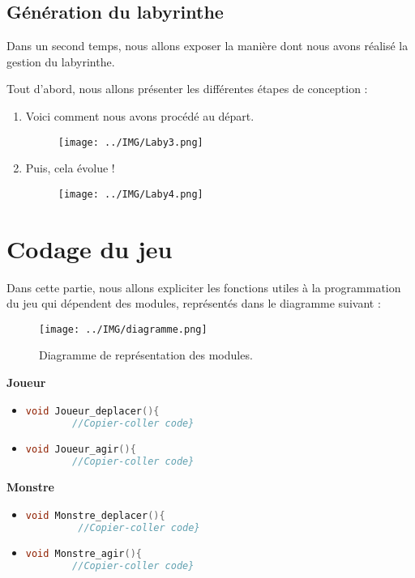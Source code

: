 \documentclass[a4paper,11pt]{report}
\begin{document}
    \section{Génération du labyrinthe}
Dans un second temps, nous allons exposer la manière dont nous avons réalisé la gestion du labyrinthe.

Tout d'abord, nous allons présenter les différentes étapes de conception :
	\begin{enumerate}
	  \item Voici comment nous avons procédé au départ.
		\begin{figure}[htbp]
			\center
			\texttt{[image: ../IMG/Laby3.png]}
		\end{figure}
	  \item	Puis, cela évolue !
		\begin{figure}[htbp]
			\center
			\texttt{[image: ../IMG/Laby4.png]}
		\end{figure}
    \end{enumerate}

  \chapter{Codage du jeu}
  Dans cette partie, nous allons expliciter les fonctions utiles à la programmation du jeu qui dépendent des modules, représentés dans le diagramme suivant :
    \begin{figure}[htbp]
      \center
      \texttt{[image: ../IMG/diagramme.png]}
      \caption{Diagramme de représentation des modules.}
    \end{figure}
  \newpage
  	\textbf{Joueur}
  		\begin{itemize}
    		\item 
		\begin{lstlisting}[language=c] 
void Joueur_deplacer(){
      	//Copier-coller code}
         \end{lstlisting}
          
    		\item \begin{lstlisting}[language=c]
void Joueur_agir(){ 
      	//Copier-coller code}
        \end{lstlisting}
  		\end{itemize}
  
    \textbf{Monstre}
   		\begin{itemize}
    		\item \begin{lstlisting}[language=c] 
void Monstre_deplacer(){
    	 //Copier-coller code}
         		  \end{lstlisting}
          
   		 	\item \begin{lstlisting}[language=c] 
void Monstre_agir(){
       	//Copier-coller code}
        	   	  \end{lstlisting}
  		\end{itemize}
\end{document}

